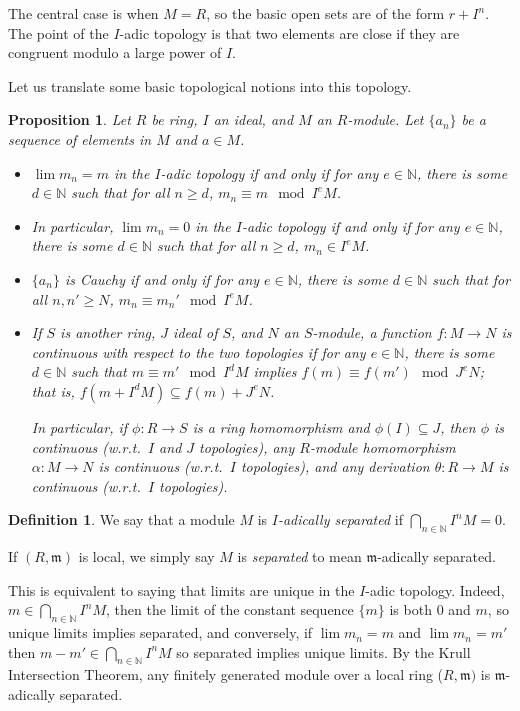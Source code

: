 \documentclass{amsart}[12pt]
\newcommand{\N}{\mathbb{N}}
\newcommand{\fm}{{\mathfrak m}}
\numberwithin{equation}{section}
\theoremstyle{plain} %
\newtheorem{prop}[equation]{Proposition}
\theoremstyle{definition}
\newtheorem{defn}[equation]{Definition}
\theoremstyle{remark}
\begin{document}
The central case is when $M=R$, so the basic open sets are of the form $r+I^n$. The point of the $I$-adic topology is that two elements are close if they are congruent modulo a large power of $I$.

Let us translate some basic topological notions into this topology.

\begin{prop} Let $R$ be ring, $I$ an ideal, and $M$ an $R$-module. Let $\{a_n\}$ be a sequence of elements in $M$ and $a\in M$.
\begin{itemize}
\item $\lim m_n = m$ in the $I$-adic topology if and only if for any $e\in \N$, there is some $d\in \N$ such that for all $n\geq d$,  $m_n \equiv m \mod I^e M$.
\item In particular, $\lim m_n = 0$ in the $I$-adic topology if and only if for any $e\in \N$, there is some $d\in \N$ such that for all $n\geq d$,  $m_n \in I^e M$.
\item $\{a_n\}$ is Cauchy if and only if for any $e\in \N$, there is some $d\in \N$ such that for all $n,n'\geq N$,  $m_n \equiv m_n' \mod I^e M$.
\item If $S$ is another ring, $J$ ideal of $S$, and $N$ an $S$-module, a function $f:M\to N$ is continuous with respect to the two topologies if for any $e\in \N$, there is some $d\in \N$ such that $m \equiv m' \mod I^d M$ implies $f(m) \equiv f(m') \mod J^e N$; that is, $f(m+I^d M) \subseteq f(m) + J^eN$. 

In particular, if $\phi:R\to S$ is a ring homomorphism and $\phi(I)\subseteq J$, then $\phi$ is continuous (w.r.t.~$I$ and $J$ topologies), any $R$-module homomorphism $\alpha:M\to N$ is continuous  (w.r.t.~$I$ topologies), and any derivation $\theta: R\to M$ is continuous (w.r.t.~$I$ topologies).
\end{itemize}
\end{prop}

\begin{defn} We say that a module $M$ is \emph{$I$-adically separated} if $\bigcap_{n\in \N} I^n M= 0$.

If $(R,\fm)$ is local, we simply say $M$ is \emph{separated} to mean $\fm$-adically separated.
\end{defn}

This is equivalent to saying that limits are unique in the $I$-adic topology. Indeed, $m\in \bigcap_{n\in \N} I^n M$, then the limit of the constant sequence $\{m\}$ is both $0$ and $m$, so unique limits implies separated, and conversely, if $\lim m_n = m$ and $\lim m_n = m'$ then $m-m' \in \bigcap_{n\in \N} I^n M$ so separated implies unique limits. By the Krull Intersection Theorem, any finitely generated module over a local ring ($R,\fm)$ is $\fm$-adically separated.
\end{document}
